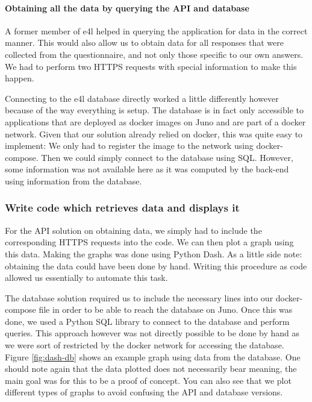 \paragraph{Obtaining all the data by querying the API and database}

A former member of \gls{e4l} helped in querying the application for
data in the correct manner. This would also allow us to obtain data
for all responses that were collected from the questionnaire, and not
only those specific to our own answers. We had to perform two HTTPS
requests with special information to make this happen.

Connecting to the \gls{e4l} database directly worked a little
differently however because of the way everything is setup. The
database is in fact only accessible to applications that are deployed
as docker images on Juno and are part of a docker network. Given that
our solution already relied on docker, this was quite easy to
implement: We only had to register the image to the network using
docker-compose. Then we could simply connect to the database using
SQL. However, some information was not available here as it was
computed by the back-end using information from the database.

\subsubsection{Write code which retrieves data and displays it}

For the API solution on obtaining data, we simply had to include the
corresponding HTTPS requests into the code. We can then plot a graph
using this data. Making the graphs was done using Python Dash. As a
little side note: obtaining the data could have been done by hand.
Writing this procedure as code allowed us essentially to automate this
task.

The database solution required us to include the necessary lines into
our docker-compose file in order to be able to reach the database on
Juno. Once this was done, we used a Python SQL library to connect to
the database and perform queries. This approach however was not
directly possible to be done by hand as we were sort of restricted by
the docker network for accessing the database. Figure
\vref{fig:dash-db} shows an example graph using data from the
database. One should note again that the data plotted does not
necessarily bear meaning, the main goal was for this to be a proof of
concept. You can also see that we plot different types of graphs to
avoid confusing the API and database versions.

